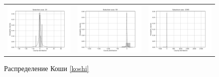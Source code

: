 \documentclass[a4paper]{article}
\begin{document}
	\begin{figure}[H]
		\centering
		\begin{tabular}{ccc}
			\includegraphics[width=55mm, height =0.25\textheight]{cauchy_10.png}
			&
			\includegraphics[width=55mm, height =0.25\textheight]{cauchy_50.png}
			&
			\includegraphics[width=55mm, height =0.25\textheight]{cauchy_1000.png}
		\end{tabular}
		\caption{Распределение Коши \eqref{koshi}}
		\label{fig:cauchy}
	\end{figure}
	
\end{document}
